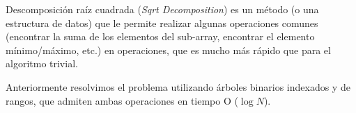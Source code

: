 Descomposición raíz cuadrada  (\emph{Sqrt Decomposition}) es un método (o una estructura de datos) que le permite realizar algunas operaciones comunes (encontrar la suma de los elementos del sub-array, encontrar el elemento mínimo/máximo, etc.) en operaciones, que es mucho más rápido que para el algoritmo trivial.

Anteriormente resolvimos el problema utilizando árboles binarios indexados y de rangos, que admiten ambas operaciones en tiempo O ($\log N$).